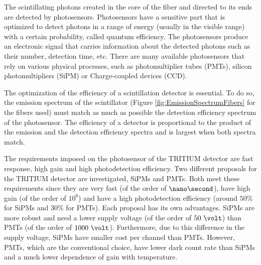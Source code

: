 The scintillating photons created in the core of the fiber and directed to its ends are detected by photosensors. Photosensors have a sensitive part that is optimized to detect photons in a range of energy (usually in the visible range) with a certain probability, called quantum efficiency. The photosensors produce an electronic signal that carries information about the detected photons such as their number, detection time, etc. There are many available photosensors that rely on various physical processes, such as photomultiplier tubes (PMTs), silicon photomultipliers (SiPM) or Charge-coupled devices (CCD).  %

The optimization of the efficiency of a scintillation detector is essential. To do so, the emission spectrum of the scintillator (Figure \ref{fig:EmissionSpectrumFibers} for the fibers used) must match as much as possible the detection efficiency spectrum of the photosensor. The efficiency of a detector is proportional to the product of the emission and the detection efficiency spectra and is largest when both spectra match.

The requirements imposed on the photosensor of the TRITIUM detector are fast response, high gain and high photodetection efficiency. Two different proposals for the TRITIUM detector are investigated, SiPMs and PMTs. Both meet these requirements since they are very fast (of the order of $\nano\second$), have high gain (of the order of $10^{6}$) and have a high photodetection efficiency (around $50\%$ for SiPMs and $30\%$ for PMTs). Each proposal has its own advantages. SiPMs are more robust and need a lower supply voltage (of the order of $50~\volt$) than PMTs (of the order of $1000~\volt$). Furthermore, due to this difference in the supply voltage, SiPMs have smaller cost per channel than PMTs. However, PMTs, which are the conventional choice, have lower dark count rate than SiPMs and a much lower dependence of gain with temperature.


